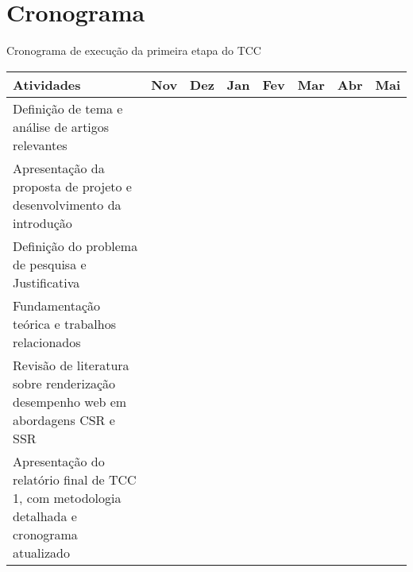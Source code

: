 \chapter{Cronograma}
\label{cap:cronograma}


\begin{quadro}[H]
    \centering
    \caption{Cronograma de execução da primeira etapa do TCC}
    \label{tab:cronograma_etapa1}
    \renewcommand{\arraystretch}{1.5}
    \begin{tabular}{|>{\centering\arraybackslash}p{3.5cm}|>{\centering\arraybackslash}p{1.25cm}|>{\centering\arraybackslash}p{1.25cm}|>{\centering\arraybackslash}p{1.25cm}|>{\centering\arraybackslash}p{1.25cm}|>{\centering\arraybackslash}p{1.25cm}|>{\centering\arraybackslash}p{1.25cm}|>{\centering\arraybackslash}p{1.25cm}|}
    \hline
    \textbf{Atividades} & \textbf{Nov} & \textbf{Dez} & \textbf{Jan} & \textbf{Fev} & \textbf{Mar} & \textbf{Abr} & \textbf{Mai} \\
    \hline
    Definição de tema e análise de artigos relevantes & \cellcolor{softCyan1} & \cellcolor{softCyan1} &  &  &  &  & \\
    \hline
    Apresentação da proposta de projeto e desenvolvimento da introdução &  &  & \cellcolor{softCyan2} & \cellcolor{softCyan2}  &  &  & \\
    \hline
    Definição do problema de pesquisa e Justificativa &  &  &  &   \cellcolor{vividTurquoise} & \cellcolor{vividTurquoise} &   & \\
    \hline
    Fundamentação teórica e trabalhos relacionados &  &  &  &  & \cellcolor{emeraldSea} & \cellcolor{emeraldSea} & \\
    \hline
    Revisão de literatura sobre renderização desempenho web em abordagens CSR e SSR &  &  &  &  & \cellcolor{deepTeal} & \cellcolor{deepTeal} & \cellcolor{deepTeal} \\
    \hline
    Apresentação do relatório final de TCC 1, com metodologia detalhada e cronograma atualizado &  &  &  &  &  & \cellcolor{darkEmerald} & \cellcolor{darkEmerald} \\
    \hline
    \end{tabular}
\end{quadro}

